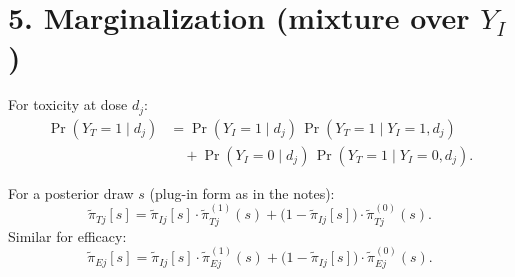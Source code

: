 \documentclass[11pt]{article}
\newcommand{\Prb}{\Pr}
\begin{document}
\section*{5. Marginalization (mixture over $Y_I$)}

For toxicity at dose $d_j$:
\begin{align*}
\Prb(Y_T=1\mid d_j)
&=\Prb(Y_I=1\mid d_j)\,\Prb(Y_T=1\mid Y_I=1,d_j)\\
&\quad +\Prb(Y_I=0\mid d_j)\,\Prb(Y_T=1\mid Y_I=0,d_j).
\end{align*}

\noindent For a posterior draw $s$ (plug-in form as in the notes):
\[
\tilde{\pi}_{Tj}[s]
=\tilde{\pi}_{Ij}[s]\cdot \tilde{\pi}_{Tj}^{(1)}(s)
+\big(1-\tilde{\pi}_{Ij}[s]\big)\cdot \tilde{\pi}_{Tj}^{(0)}(s).
\]
\noindent Similar for efficacy:
\[
\tilde{\pi}_{Ej}[s]
=\tilde{\pi}_{Ij}[s]\cdot \tilde{\pi}_{Ej}^{(1)}(s)
+\big(1-\tilde{\pi}_{Ij}[s]\big)\cdot \tilde{\pi}_{Ej}^{(0)}(s).
\]
\end{document}
